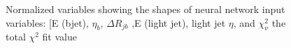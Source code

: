 \begin{figure}[h!]
\vspace{-4.5mm}
\hfil
{}
\caption{Normalized variables showing the shapes of neural network input variables: [E (bjet), $\eta_b$, $\Delta R_{jb}$ ,E (light jet), light jet $\eta$, and $\chi^2_\nu$ the total $\chi^2$ fit value  }
\label{fig:VarPlots4}
\end{figure}


